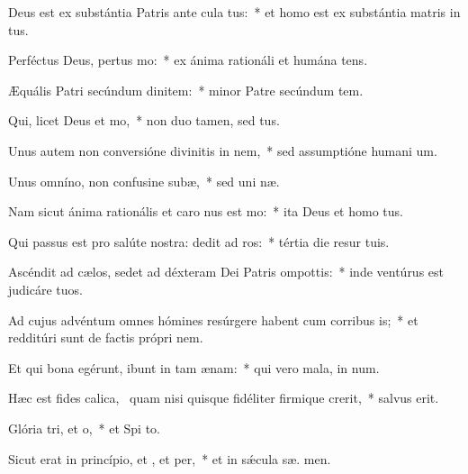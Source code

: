 \item Deus est ex substántia Patris ante cula tus:~* et homo est ex substántia matris in  tus.
\item Perféctus Deus, pertus mo:~* ex ánima rationáli et humána  tens.
\item Æquális Patri secúndum dinitem:~* minor Patre secúndum tem.
\item Qui, licet Deus  et mo,~* non duo tamen, sed   tus.
\item Unus autem non conversióne divinitis in nem,~* sed assumptióne humani  um.
\item Unus omníno, non confusine subæ,~* sed uni næ.
\item Nam sicut ánima rationális et caro nus est mo:~* ita Deus et homo   tus.
\item Qui passus est pro salúte nostra: dedit ad ros:~* tértia die resur  tuis.
\item Ascéndit ad cælos, sedet ad déxteram Dei Patris ompottis:~* inde ventúrus est judicáre   tuos.
\item Ad cujus advéntum omnes hómines resúrgere habent cum corribus is;~* et redditúri sunt de factis própri nem.
\item Et qui bona egérunt, ibunt in tam ænam:~* qui vero mala, in  num.
\item Hæc est fides calica,~\pscross{} quam nisi quisque fidéliter firmique crerit,~* salvus   erit.
\item Glória tri, et o,~* et Spi to.
\item Sicut erat in princípio, et , et per,~* et in sǽcula sæ. men.
